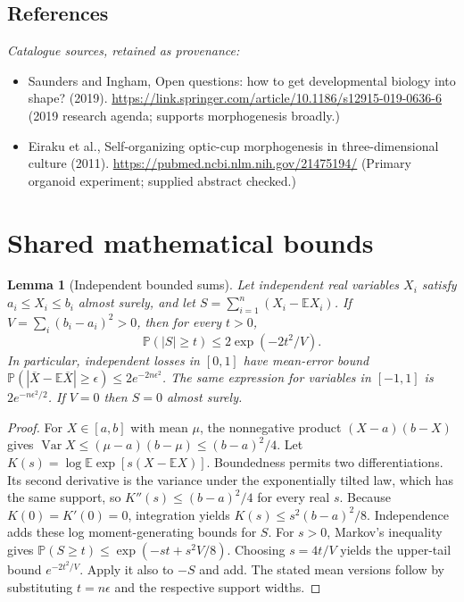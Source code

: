 \documentclass[11pt]{article}
\newcommand{\E}{\mathbb E}
\newcommand{\Prob}{\mathbb P}
\DeclareMathOperator{\Var}{Var}
\providecommand{\E}{\mathbb E}
\providecommand{\Prob}{\mathbb P}
\providecommand{\Var}{\operatorname{Var}}
\newtheorem{sharedlemma}{Lemma}[section]
\begin{document}
\subsection{References}
\noindent\emph{Catalogue sources, retained as provenance:}
\begin{itemize}
\item Saunders and Ingham, Open questions: how to get developmental biology into shape? (2019). \url{https://link.springer.com/article/10.1186/s12915-019-0636-6} (2019 research agenda; supports morphogenesis broadly.)
\item Eiraku et al., Self-organizing optic-cup morphogenesis in three-dimensional culture (2011). \url{https://pubmed.ncbi.nlm.nih.gov/21475194/} (Primary organoid experiment; supplied abstract checked.)
\end{itemize}
\clearpage


\appendix
\section{Shared mathematical bounds}\label{app:bounds}
\begin{sharedlemma}[Independent bounded sums]\label{lem:bounded}
Let independent real variables $X_i$ satisfy $a_i\leq X_i\leq b_i$ almost surely,
and let $S=\sum_{i=1}^n(X_i-\E X_i)$. If
$V=\sum_i(b_i-a_i)^2>0$, then for every $t>0$,
\[
 \Prob(|S|\geq t)\leq 2\exp(-2t^2/V).
\]
In particular, independent losses in $[0,1]$ have mean-error bound
$\Prob(|\overline X-\E\overline X|\geq\epsilon)
\leq2e^{-2n\epsilon^2}$. The same expression for variables in $[-1,1]$
is $2e^{-n\epsilon^2/2}$. If $V=0$ then $S=0$ almost surely.
\end{sharedlemma}
\begin{proof}
For $X\in[a,b]$ with mean $\mu$, the nonnegative product
$(X-a)(b-X)$ gives
$\Var X\leq(\mu-a)(b-\mu)\leq(b-a)^2/4$.
Let $K(s)=\log\E\exp[s(X-\E X)]$.
Boundedness permits two differentiations. Its second derivative is the variance
under the exponentially tilted law, which has the same support, so
$K''(s)\leq(b-a)^2/4$ for every real $s$.
Because $K(0)=K'(0)=0$, integration yields
$K(s)\leq s^2(b-a)^2/8$.
Independence adds these log moment-generating bounds for $S$.
For $s>0$, Markov's inequality gives
$\Prob(S\geq t)\leq\exp(-st+s^2V/8)$.
Choosing $s=4t/V$ yields the upper-tail bound $e^{-2t^2/V}$.
Apply it also to $-S$ and add. The stated mean versions follow by substituting
$t=n\epsilon$ and the respective support widths.
\end{proof}
\end{document}
